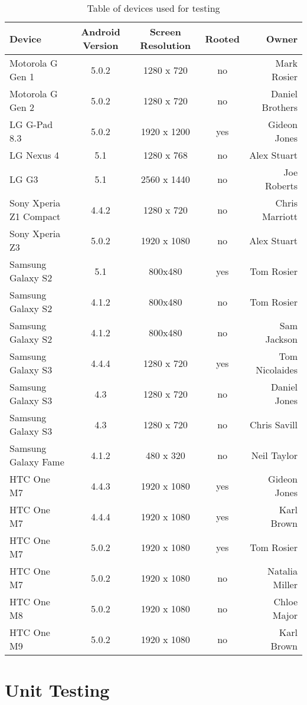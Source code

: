 \begin{center}
\begin{table}
\begin{tabular}{ l c c c r }
\hline
Device & Android Version & Screen Resolution & Rooted & Owner \\
\hline
Motorola G Gen 1 & 5.0.2 & 1280 x 720 & no & Mark Rosier \\
Motorola G Gen 2 & 5.0.2 & 1280 x 720 & no & Daniel Brothers \\ 
\hline
LG G-Pad 8.3 & 5.0.2 & 1920 x 1200 & yes & Gideon Jones \\
LG Nexus 4 & 5.1 & 1280 x 768 & no & Alex Stuart \\
LG G3 & 5.1 & 2560 x 1440 & no & Joe Roberts \\
\hline
Sony Xperia Z1 Compact & 4.4.2 & 1280 x 720 & no & Chris Marriott \\ 
Sony Xperia Z3 & 5.0.2 & 1920 x 1080 & no & Alex Stuart \\
\hline
Samsung Galaxy S2 & 5.1 & 800x480 & yes & Tom Rosier \\
Samsung Galaxy S2 & 4.1.2 & 800x480 & no & Tom Rosier \\
Samsung Galaxy S2 & 4.1.2 & 800x480 & no & Sam Jackson \\
Samsung Galaxy S3 & 4.4.4 & 1280 x 720 & yes & Tom Nicolaides \\
Samsung Galaxy S3 & 4.3 & 1280 x 720 & no & Daniel Jones \\
Samsung Galaxy S3 & 4.3 & 1280 x 720 & no & Chris Savill \\
Samsung Galaxy Fame & 4.1.2 & 480 x 320 & no & Neil Taylor \\
\hline
HTC One M7 & 4.4.3 & 1920 x 1080 & yes & Gideon Jones \\
HTC One M7 & 4.4.4 & 1920 x 1080 & yes & Karl Brown \\
HTC One M7 & 5.0.2 & 1920 x 1080 & yes & Tom Rosier \\
HTC One M7 & 5.0.2 & 1920 x 1080 & no & Natalia Miller \\
HTC One M8 & 5.0.2 & 1920 x 1080 & no & Chloe Major \\
HTC One M9 & 5.0.2 & 1920 x 1080 & no & Karl Brown \\
\hline
\end{tabular}
\caption{Table of devices used for testing}
\label{table:device_table}
\end{table}
\end{center}

\section{Unit Testing}

